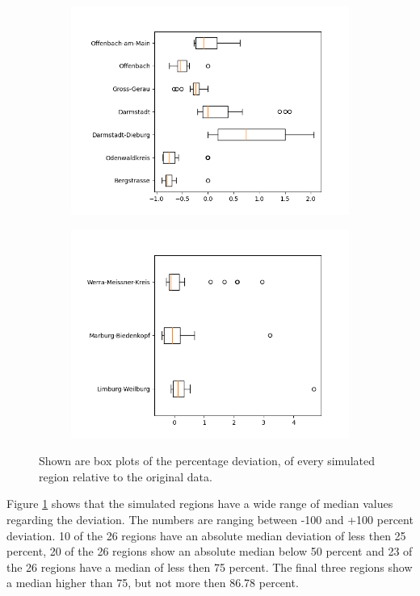 \begin{figure}
\begin{subfigure}[b]{0.4\textwidth}
		\includegraphics[width=\textwidth]{./figures/76d/deviation_box76_alt3.png}	
	\end{subfigure}
	\begin{subfigure}[b]{0.4\textwidth}
		\centering
		\includegraphics[width=\textwidth]{./figures/76d/deviation_box76_alt4.png}	
	\end{subfigure}
	\caption{Shown are box plots of the percentage deviation, of every simulated region relative to the original data.}
	\label{fig:76_sim_box}
\end{figure}

Figure \ref*{fig:76_sim_box} shows that the simulated regions have a wide range of median values regarding the deviation.
The numbers are ranging between -100 and +100 percent deviation. 10 of the 26 regions have an absolute median deviation of less then 25 percent,
20 of the 26 regions show an absolute median below 50 percent and 23 of the 26 regions have a median of less then
75 percent. The final three regions show a median higher than 75, but not more then 86.78 percent.



